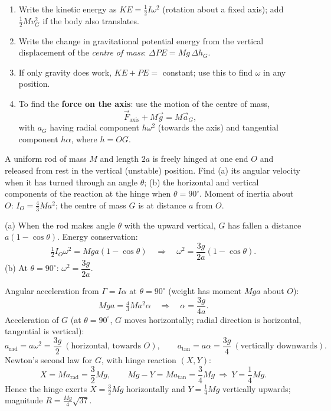 \documentclass[11pt]{article}
\begin{document}
\begin{methode}
\begin{enumerate}
\item Write the kinetic energy as $KE=\tfrac12 I\omega^2$ (rotation about a fixed axis); add $\tfrac12 Mv_G^2$ if the body also translates.
\item Write the change in gravitational potential energy from the vertical displacement of the \emph{centre of mass}: $\Delta PE=Mg\,\Delta h_G$.
\item If only gravity does work, $KE+PE=$ constant; use this to find $\omega$ in any position.
\item To find the \textbf{force on the axis}: use the motion of the centre of mass,
\[
\vec{F}_{\text{axis}}+M\vec{g}=M\vec{a}_G,
\]
with $a_G$ having radial component $h\omega^2$ (towards the axis) and tangential component $h\alpha$, where $h=OG$.
\end{enumerate}
\end{methode}

\begin{exoresolu}
A uniform rod of mass $M$ and length $2a$ is freely hinged at one end $O$ and released from rest in the vertical (unstable) position. Find (a) its angular velocity when it has turned through an angle $\theta$; (b) the horizontal and vertical components of the reaction at the hinge when $\theta=90^{\circ}$.
\tcblower
Moment of inertia about $O$: $I_O=\tfrac43 Ma^2$; the centre of mass $G$ is at distance $a$ from $O$.

(a) When the rod makes angle $\theta$ with the upward vertical, $G$ has fallen a distance $a(1-\cos\theta)$. Energy conservation:
\[
\tfrac12 I_O\omega^2=Mga(1-\cos\theta)
\quad\Longrightarrow\quad
\omega^2=\frac{3g}{2a}(1-\cos\theta).
\]
(b) At $\theta=90^{\circ}$: $\omega^2=\dfrac{3g}{2a}$.

Angular acceleration from $\Gamma=I\alpha$ at $\theta=90^{\circ}$ (weight has moment $Mga$ about $O$):
\[
Mga=\tfrac43 Ma^2\alpha
\quad\Longrightarrow\quad
\alpha=\frac{3g}{4a}.
\]
Acceleration of $G$ (at $\theta=90^\circ$, $G$ moves horizontally; radial direction is horizontal, tangential is vertical):
\[
a_{\text{rad}}=a\omega^2=\frac{3g}{2}\ (\text{horizontal, towards }O),\qquad
a_{\text{tan}}=a\alpha=\frac{3g}{4}\ (\text{vertically downwards}).
\]
Newton's second law for $G$, with hinge reaction $(X,Y)$:
\[
X=Ma_{\text{rad}}=\frac{3}{2}Mg,\qquad
Mg-Y=Ma_{\text{tan}}=\frac{3}{4}Mg
\ \Longrightarrow\ 
Y=\frac{1}{4}Mg.
\]
Hence the hinge exerts $\boxed{X=\tfrac32 Mg}$ horizontally and $\boxed{Y=\tfrac14 Mg}$ vertically upwards; magnitude $R=\tfrac{Mg}{4}\sqrt{37}$.
\end{exoresolu}
\end{document}
